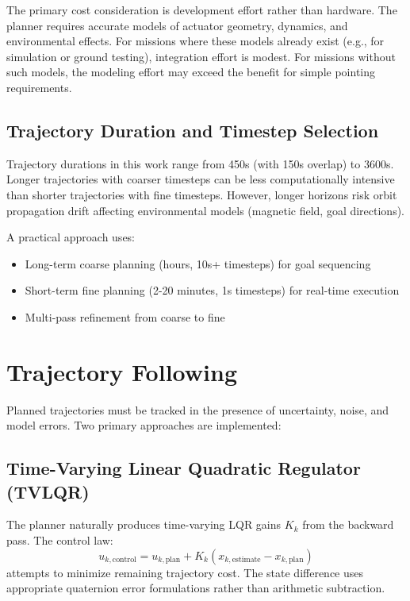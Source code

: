 \documentclass[conference]{IEEEtran}
\begin{document}
The primary cost consideration is development effort rather than hardware. The planner requires accurate models of actuator geometry, dynamics, and environmental effects. For missions where these models already exist (e.g., for simulation or ground testing), integration effort is modest. For missions without such models, the modeling effort may exceed the benefit for simple pointing requirements.

\subsection{Trajectory Duration and Timestep Selection}\label{subsec:trajectory_params}

Trajectory durations in this work range from 450s (with 150s overlap) to 3600s. Longer trajectories with coarser timesteps can be less computationally intensive than shorter trajectories with fine timesteps. However, longer horizons risk orbit propagation drift affecting environmental models (magnetic field, goal directions).

A practical approach uses:
\begin{itemize}
    \item Long-term coarse planning (hours, 10s+ timesteps) for goal sequencing
    \item Short-term fine planning (2-20 minutes, 1s timesteps) for real-time execution
    \item Multi-pass refinement from coarse to fine
\end{itemize}


\section{Trajectory Following}\label{sec:following}

Planned trajectories must be tracked in the presence of uncertainty, noise, and model errors. Two primary approaches are implemented:

\subsection{Time-Varying Linear Quadratic Regulator (TVLQR)}\label{subsec:tvlqr}

The planner naturally produces time-varying LQR gains $K_k$ from the backward pass. The control law:
\begin{equation}\label{eq:tvlqr}
    u_{k,\text{control}} = u_{k,\text{plan}} + K_k(x_{k,\text{estimate}} - x_{k,\text{plan}})
\end{equation}
attempts to minimize remaining trajectory cost. The state difference uses appropriate quaternion error formulations rather than arithmetic subtraction.
\end{document}
